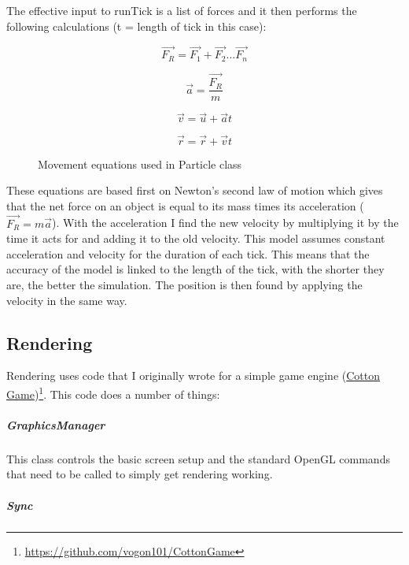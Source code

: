 			The effective input to runTick is a list of forces and it then performs the following calculations (t = length of tick in this case):
			
			\begin{figure}
				\begin{equation}
					\vec{F_{R}} = \vec{F_{1}} + \vec{F_{2}} ... \vec{F_{n}}
				\end{equation}
				
				\begin{equation}
					\vec{a} = \frac{\vec{F_{R}}}{m}
				\end{equation}
				
				\begin{equation}
					\vec{v} = \vec{u} + \vec{a}t
				\end{equation}
				
				\begin{equation}
					\vec{r} = \vec{r} + \vec{v}t
				\end{equation}
				\caption{Movement equations used in Particle class}
				\label{fig:movEqn}
			\end{figure}
		
			These equations are based first on Newton's second law of motion which gives that the net force on an object is equal to its mass times its acceleration ($\vec{F_{R}} = m\vec{a}$). With the acceleration I find the new velocity by multiplying it by the time it acts for and adding it to the old velocity. This model assumes constant acceleration and velocity for the duration of each tick. This means that the accuracy of the model is linked to the length of the tick, with the shorter they are, the better the simulation. The position is then found by applying the velocity in the same way.
	\newpage
	\subsection{Rendering}
		
		Rendering uses code that I originally wrote for a simple game engine (\href{https://github.com/vogon101/CottonGame}{Cotton Game})\footnote{\url{https://github.com/vogon101/CottonGame}}. This code does a number of things:
		
		\subparagraph{GraphicsManager} 
			
			This class controls the basic screen setup and the standard OpenGL commands that need to be called to simply get rendering working.
		
		\subparagraph{Sync} 
		
